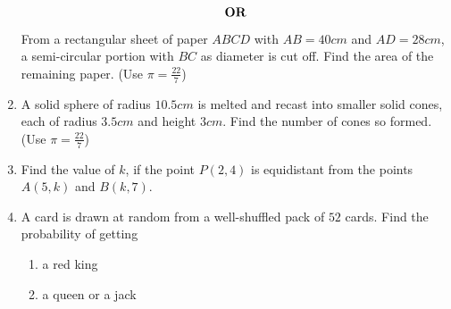 \documentclass[journal,12pt,twocolumn]{IEEEtran}
\renewcommand\thesection{\arabic{section}}
\begin{document}
\begin{enumerate}[label=\thesection.\arabic*.,ref=\thesection.\theenumi]
\begin{figure}[h!]
    \caption{}
    \label{fig4}
 \end{figure}
\begin{align}
    \centering \vec{OR}\nonumber
\end{align}
From a rectangular sheet of paper $ABCD$ with $AB = 40 cm$ and $AD = 28 cm$, a semi-circular portion with $BC$ as diameter is cut off. Find the area of the remaining paper. (Use $\pi=\frac{22}{7}$)\\
\item A solid sphere of radius $10.5 cm$ is melted and recast into smaller solid cones, each of radius $3.5 cm$ and height $3 cm$. Find the number of cones so formed. (Use $\pi=\frac{22}{7}$)\\
\item Find the value of $k$, if the point $P(2, 4)$ is equidistant from the points $A(5, k)$ and $B(k, 7)$.
\item A card is drawn at random from a well-shuffled pack of $52$ cards. Find the
probability of getting\\
 \begin{enumerate}
     \item a red king
     \item a queen or a jack
 \end{enumerate}
\end{enumerate}
\end{document}
